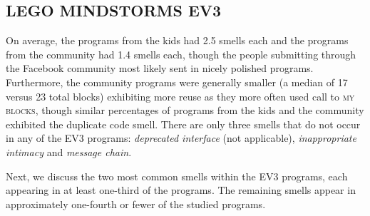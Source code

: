 \documentclass[conference]{IEEEtran}
\newcommand{\ms}{LEGO MINDSTORMS EV3}
\newcommand{\mbs}{\textsc{my blocks}}
\begin{document}


\subsection{\ms}
On average, the programs from the kids had 2.5 smells each and the programs from the community  had 1.4 smells each, though  the people submitting through the Facebook community most likely sent in nicely polished programs. Furthermore, the community programs were generally smaller (a median of 17 versus 23 total blocks) exhibiting more reuse as they more often used call to \mbs, though similar percentages of programs from the kids and the community exhibited the duplicate code smell.  There are only three smells that do not occur in any of the EV3 programs: \emph{deprecated interface} (not applicable), \emph{inappropriate intimacy} and \emph{message chain}.

Next, we discuss the two most common smells within the EV3 programs, each appearing in at least one-third of the programs. The remaining smells appear in approximately one-fourth or fewer of the studied programs. 

\end{document}
